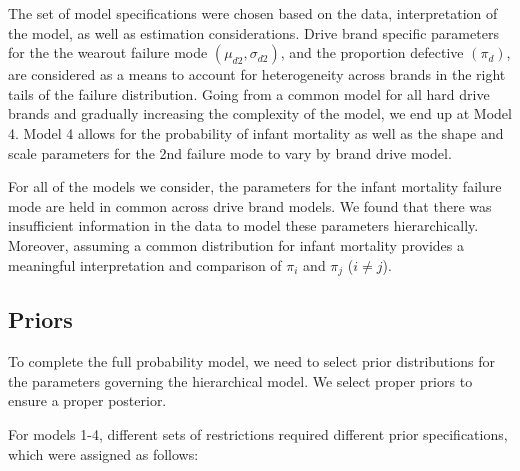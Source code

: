 \documentclass[12pt]{article}
\begin{document}
The set of model specifications were chosen based on the data, interpretation of the model, as well as estimation considerations. Drive brand specific parameters for the the wearout failure mode $(\mu_{d2},\sigma_{d2})$, and the proportion defective $(\pi_d)$, are considered as a means to account for heterogeneity across brands in the right tails of the failure distribution.  Going from a common model for all hard drive brands and gradually increasing the complexity of the model, we end up at Model 4.  Model 4 allows for the probability of infant mortality as well as the shape and scale parameters for the 2nd failure mode to vary by brand drive model.

For all of the models we consider, the parameters for the infant mortality failure mode are held in common across drive brand models. We found that there was insufficient information in the data to model these parameters hierarchically.  Moreover, assuming a common distribution for infant mortality provides a meaningful interpretation and comparison of $\pi_i$ and $\pi_j$ ($i \neq j$). 

\subsection{Priors}
To complete the full probability model, we need to select prior distributions for the parameters governing the hierarchical model. We select proper priors to ensure a proper posterior.

For models 1-4, different sets of restrictions required different prior specifications, which were assigned as follows:
\end{document}
